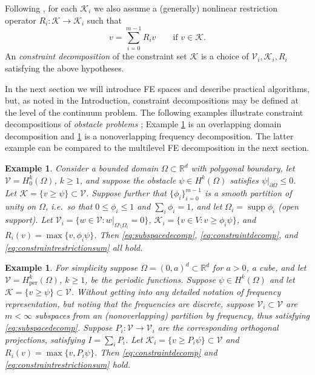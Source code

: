 \documentclass[letterpaper,final,12pt,reqno]{amsart}
\theoremstyle{cstyle}
\theoremstyle{dstyle}
\newtheorem{example}[theorem]{Example}
\numberwithin{equation}{section}
\numberwithin{figure}{section}
\numberwithin{table}{section}
\numberwithin{theorem}{section}
\newcommand{\RR}{\mathbb{R}}
\newcommand{\cK}{\mathcal{K}}
\newcommand{\cV}{\mathcal{V}}
\newcommand{\supp}{\operatorname{supp}}
\begin{document}
Following \cite{Tai2003}, for each $\cK_i$ we also assume a (generally) nonlinear restriction operator $R_i : \cK \to \cK_i$ such that %
\begin{equation}
v = \sum_{i=0}^{m-1} R_i v \qquad \text{if } v \in \cK.  \label{eq:constraintrestrictionsum}
\end{equation}
An \emph{constraint decomposition} of the constraint set $\cK$ is a choice of $\cV_i,\cK_i,R_i$ satisfying the above hypotheses.

In the next section we will introduce FE spaces and describe practical algorithms, but, as noted in the Introduction, constraint decompositions may be defined at the level of the continuum problem.  The following examples illustrate constraint decompositions of \emph{obstacle problems} \cite{GraeserKornhuber2009}; Example \ref{ex:domaindecomposition} is an overlapping domain decomposition and \ref{ex:frequencydecomposition} is a nonoverlapping frequency decomposition.  The latter example can be compared to the multilevel FE decomposition in the next section.

\begin{example}  \label{ex:domaindecomposition}  Consider a bounded domain $\Omega \subset \RR^d$ with polygonal boundary, let $\cV = H_0^k(\Omega)$, $k\ge 1$, and suppose the obstacle $\psi \in H^k(\Omega)$ satisfies $\psi|_{\partial \Omega} \le 0$.  Let $\cK = \{v \ge \psi\} \subset \cV$.  Suppose further that $\{\phi_i\}_{i=0}^{m-1}$ is a smooth partition of unity on $\Omega$, i.e.~so that $0 \le \phi_i\le 1$ and $\sum_i \phi_i = 1$, and let $\Omega_i = \supp \phi_i$ (open support).  Let $\cV_i = \{w \in \cV:w|_{\Omega \setminus \Omega_i} =0 \}$, $\cK_i = \{v \in V: v \ge \phi_i \psi\}$, and $R_i(v) = \max\{v,\phi_i \psi\}$.  Then \eqref{eq:subspacedecomp}, \eqref{eq:constraintdecomp}, and \eqref{eq:constraintrestrictionsum} all hold.
\end{example}

\begin{example}  \label{ex:frequencydecomposition}  For simplicity suppose $\Omega = (0,a)^d \subset \RR^d$ for $a>0$, a cube, and let $\cV = H_{\text{per}}^k(\Omega)$, $k\ge 1$, be the periodic functions.  Suppose $\psi \in H^k(\Omega)$ and let $\cK = \{v \ge \psi\} \subset \cV$.  Without getting into any detailed notation of frequency representation, but noting that the frequencies are discrete, suppose $\cV_i \subset \cV$ are $m<\infty$ subspaces from an (nonoverlapping) partition by frequency, thus satisfying \eqref{eq:subspacedecomp}.  Suppose $P_i:\cV \to \cV_i$ are the corresponding orthogonal projections, satisfying $I = \sum_i P_i$.  Let $\cK_i = \{v \ge P_i \psi\} \subset \cV$ and $R_i(v) = \max\{v,P_i \psi\}$.  Then \eqref{eq:constraintdecomp} and \eqref{eq:constraintrestrictionsum} hold.
\end{example}
\end{document}
